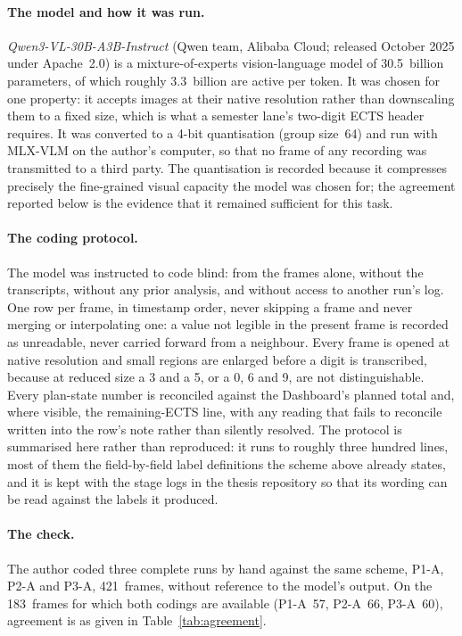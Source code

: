 \paragraph{The model and how it was run.}
\emph{Qwen3-VL-30B-A3B-Instruct} (Qwen team, Alibaba Cloud; released October 2025 under Apache~2.0) is a mixture-of-experts vision-language model of 30.5~billion parameters, of which roughly 3.3~billion are active per token. It was chosen for one property: it accepts images at their native resolution rather than downscaling them to a fixed size, which is what a semester lane's two-digit ECTS header requires. It was converted to a 4-bit quantisation (group size~64) and run with MLX-VLM on the author's computer, so that no frame of any recording was transmitted to a third party. The quantisation is recorded because it compresses precisely the fine-grained visual capacity the model was chosen for; the agreement reported below is the evidence that it remained sufficient for this task.
\paragraph{The coding protocol.}
The model was instructed to code blind: from the frames alone, without the transcripts, without any prior analysis, and without access to another run's log. One row per frame, in timestamp order, never skipping a frame and never merging or interpolating one: a value not legible in the present frame is recorded as unreadable, never carried forward from a neighbour. Every frame is opened at native resolution and small regions are enlarged before a digit is transcribed, because at reduced size a 3 and a 5, or a 0, 6 and 9, are not distinguishable. Every plan-state number is reconciled against the Dashboard's planned total and, where visible, the remaining-ECTS line, with any reading that fails to reconcile written into the row's note rather than silently resolved. The protocol is summarised here rather than reproduced: it runs to roughly three hundred lines, most of them the field-by-field label definitions the scheme above already states, and it is kept with the stage logs in the thesis repository so that its wording can be read against the labels it produced.
\paragraph{The check.}
The author coded three complete runs by hand against the same scheme, P1-A, P2-A and P3-A, 421~frames, without reference to the model's output. On the 183~frames for which both codings are available (P1-A~57, P2-A~66, P3-A~60), agreement is as given in Table~\ref{tab:agreement}.

